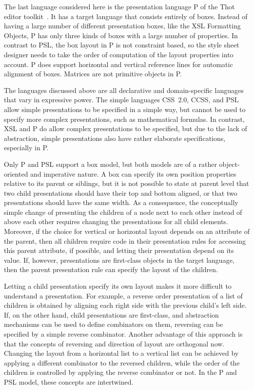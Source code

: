  The last language considered here is the presentation language P of the Thot editor toolkit~\cite{quint97thot}. It has a target language that consists entirely of boxes. Instead of having a large number of different presentation boxes, like the XSL Formatting Objects, P has only three kinds of boxes with a large number of properties. In contrast to PSL, the box layout in P is not constraint based, so the style sheet designer needs to take the order of computation of the layout properties into account. P does support horizontal and vertical reference lines for automatic alignment of boxes. Matrices are not primitive objects in P.

 The languages discussed above are all declarative and domain-specific languages that vary in expressive power. The simple languages CSS~2.0, CCSS, and PSL allow simple presentations to be specified in a simple way, but cannot be used to specify more complex presentations, such as mathematical formulas. In contrast, XSL and P do allow complex presentations to be specified, but due to the lack of abstraction, simple presentations also have rather elaborate specifications, especially in P. 

Only P and PSL support a box model, but both models are of a rather object-oriented and imperative nature. A box can specify its own position properties relative to its parent or siblings, but it is not possible to state at parent level that two child presentations should have their top and bottom aligned, or that two presentations should have the same width. As a consequence, the conceptually simple change of presenting the children of a node next to each other instead of above each other requires changing the presentations for all child elements. Moreover, if the choice for vertical or horizontal layout depends on an attribute of the parent, then all children require code in their presentation rules for accessing this parent attribute, if possible, and letting their presentation depend on its value. If, however, presentations are first-class objects in the target language, then the parent presentation rule can specify the layout of the children.

Letting a child presentation specify its own layout makes it more difficult to understand a presentation. For example, a reverse order presentation of a list of children is obtained by aligning each right side with the previous child's left side. If, on the other hand, child presentations are first-class, and abstraction mechanisms can be used to define combinators on them, reversing can be specified by a simple reverse combinator. Another advantage of this approach is that the concepts of reversing and direction of layout are orthogonal now. Changing the layout from a horizontal list to a vertical list can be achieved by applying a different combinator to the reversed children, while the order of the children is controlled by applying the reverse combinator or not. In the P and PSL model, these concepts are intertwined.

